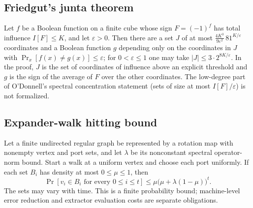 \begin{result}
\subsection{Friedgut's junta theorem}
Let $f$ be a Boolean function on a finite cube whose sign $F=(-1)^f$ has total
influence $I[F]\le K$, and let $\varepsilon>0$. Then there are a set $J$ of at most
$\frac{4K^3}{9\varepsilon^2}\,81^{K/\varepsilon}$ coordinates and a Boolean function
$g$ depending only on the coordinates in $J$ with $\Pr_x[f(x)\ne g(x)]\le\varepsilon$;
for $0<\varepsilon\le1$ one may take $|J|\le3\cdot2^{8K/\varepsilon}$. In the proof, $J$ is
the set of coordinates of influence above an explicit threshold and $g$ is the sign of
the average of $F$ over the other coordinates. The low-degree part of O'Donnell's
spectral concentration statement (sets of size at most $I[F]/\varepsilon$) is not
formalized.\citep{Friedgut1998,ODonnell2014}
\end{result}


\begin{result}
\subsection{Expander-walk hitting bound}
Let a finite undirected regular graph be represented by a rotation map with
nonempty vertex and port sets, and let $\lambda$ be its nonconstant spectral
operator-norm bound. Start a walk at a uniform vertex and choose each port
uniformly. If each set $B_i$ has density at most $0\le\mu\le1$, then
\[
\Pr[v_i\in B_i\text{ for every }0\le i\le t]
 \le \mu\bigl(\mu+\lambda(1-\mu)\bigr)^t.
\]
The sets may vary with time. This is a finite probability bound; machine-level
error reduction and extractor evaluation costs are separate obligations.
\citep{AjtaiKomlosSzemeredi1987,Kahale1995,Vadhan2012}
\end{result}

